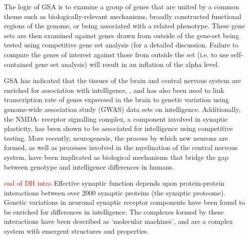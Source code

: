 The logic of GSA is to examine a group of genes that are united by a common theme such as biologically-relevant mechanisms, \cite{hill2014human}  broadly constructed functional regions of the genome, \cite{hill2016molecular}  or being associated with a related phenotype. \cite{hill2016examining}  These gene sets are then examined against genes drawn from outside of the gene-set being tested using competitive gene set analysis (for a detailed discussion. \cite{de2016statistical}  Failure to compare the genes of interest against those from outside the set (i.e. to use self-contained gene set analysis) will result in an inflation of the alpha level. \cite{de2016statistical} 

GSA has indicated that the tissues of the brain and central nervous system are enriched for association with intelligence, \cite{hill2016molecular},\cite{johnson2016systems}  and has also been used to link transcription rate of genes expressed in the brain to genetic variation using genome-wide association study (GWAS) data sets on intelligence. \cite{hill2019combined}  Additionally, the NMDA- receptor signalling complex, a component involved in synaptic plasticity, has been shown to be associated for intelligence using competitive testing. \cite{hill2014human}  More recently, neurogenesis, the process by which new neurons are formed, as well as processes involved in the myelination of the central nervous system, have been implicated as biological mechanisms that bridge the gap between genotype and intelligence differences in humans. \cite{hill2019combined}  

\textcolor{red}{end of DH intro}
Effective synaptic function depends upon protein-protein interactions between over 2000 synaptic proteins (the synaptic proteome). Genetic variations in neuronal synaptic receptor components have been found to be enriched for differences in intelligence. \cite{hill2014human}  The complexes formed by these interactions have been described as ‘molecular machines’, and are a complex system with emergent structures and properties. \cite{grant2012synaptopathies}

